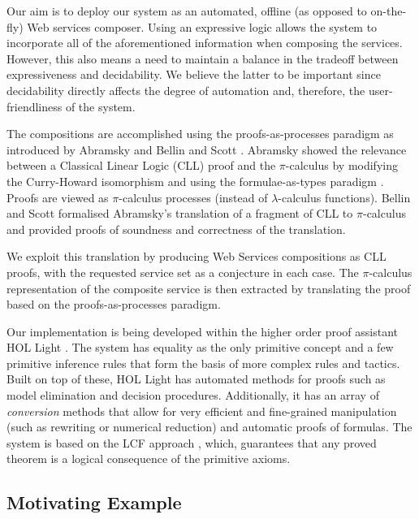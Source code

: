 \documentclass[copyright,creativecommons]{eptcs}
\begin{document}
Our aim is to deploy our system as an automated, offline (as opposed to on-the-fly) Web services composer. Using an expressive logic allows the system to incorporate all of the aforementioned information when composing the services. However, this also means a need to maintain a balance in the tradeoff between expressiveness and decidability. We believe the latter to be important since decidability directly affects the degree of automation and, therefore, the user-friendliness of the system. 

The compositions are accomplished using the proofs-as-processes paradigm as introduced by Abramsky \cite{abramsky1994proofs} and Bellin and Scott \cite{bellin1994}. Abramsky showed the relevance between a Classical Linear Logic (CLL) \cite{girard1995linear} proof and the $\pi$-calculus \cite{milner1999communicating} by modifying the Curry-Howard isomorphism and using the formulae-as-types paradigm \cite{howard1980formulae}. Proofs are viewed as $\pi$-calculus processes (instead of $\lambda$-calculus functions). Bellin and Scott formalised Abramsky's translation of a fragment of CLL to $\pi$-calculus and provided proofs of soundness and correctness of the translation. 

We exploit this translation by producing Web Services compositions as CLL proofs, with the requested service set as a conjecture in each case. The $\pi$-calculus representation of the composite service is then extracted by translating the proof based on the proofs-as-processes paradigm.

Our implementation is being developed within the higher order proof assistant HOL Light \cite{harrison1996hol}. The system has equality as the only primitive concept and a few primitive inference rules that form the basis of more complex rules and tactics. Built on top of these, HOL Light has automated methods for proofs such as model elimination \cite{harrison1996optimizing} and decision procedures. Additionally, it has an array of \emph{conversion} methods that allow for very efficient and fine-grained manipulation (such as rewriting or numerical reduction) and automatic proofs of formulas. The system is based on the LCF approach \cite{paulson1990logic}, which, guarantees that any proved theorem is a logical consequence of the primitive axioms.

\subsection{Motivating Example}
\end{document}
